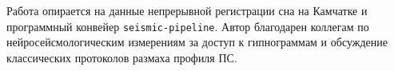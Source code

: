 \documentclass{article}
\begin{document}
\begin{ack}
Работа опирается на данные непрерывной регистрации сна на Камчатке и
программный конвейер \texttt{seismic-pipeline}. Автор благодарен
коллегам по нейросейсмологическим измерениям за доступ к гипнограммам
и обсуждение классических протоколов размаха профиля ПС.
\end{ack}

{\small


}
\end{document}
